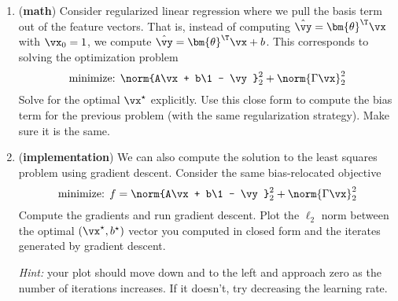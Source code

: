 \documentclass[189]{pset}
\begin{document}
\begin{enumerate}
  \item (\textbf{math}) Consider regularized linear regression where
    we pull the basis term out of the feature vectors. That is,
    instead of computing $\hat\vy = \bm{\theta}^\T\vx$ with $\vx_0 =
    1$, we compute $\hat\vy = \bm{\theta}^\T\vx + b$. This corresponds
    to solving the optimization problem
    \[
      \text{minimize: } \norm{A\vx + b\1 - \vy}_2^2 + \norm{\Gamma
        \vx}_2^2
    \]
    Solve for the optimal $\vx^\star$ explicitly. Use this close form
    to compute the bias term for the previous problem (with the same
    regularization strategy). Make sure it is the same.
  \item (\textbf{implementation}) We can also compute the solution to
    the least squares problem using gradient descent. Consider the
    same bias-relocated objective
    \[
      \text{minimize: } f = \norm{A\vx + b\1 - \vy}_2^2 + \norm{\Gamma
      \vx}_2^2
    \]
    Compute the gradients and run gradient descent. Plot the $\ell_2$
    norm between the optimal $(\vx^\star, b^\star)$ vector you
    computed in closed form and the iterates generated by gradient
    descent.

    \textit{Hint:} your plot should move down and to the left and
    approach zero as the number of iterations increases. If it
    doesn't, try decreasing the learning rate.
  \end{enumerate}

  \hrulefill

  \clearpage
\end{document}
